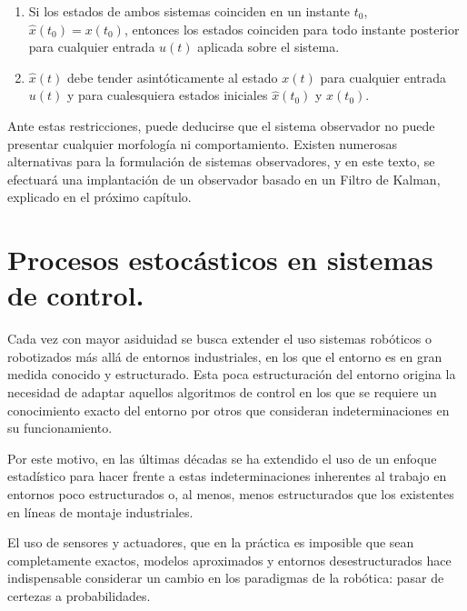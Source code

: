 \begin{enumerate}

\item Si los estados de ambos sistemas coinciden en un instante $t_0$, $\hat{x}(t_0) = x(t_0)$, entonces los estados coinciden para todo instante posterior para cualquier entrada $u(t)$ aplicada sobre el sistema. \par 

\item $\hat{x}(t)$ debe tender asintóticamente al estado $x(t)$ para cualquier entrada $u(t)$ y para cualesquiera estados iniciales $\hat{x}(t_0)$ y $x(t_0)$. \par 

\end{enumerate}

Ante estas restricciones, puede deducirse que el sistema observador no puede presentar cualquier morfología ni comportamiento. Existen numerosas alternativas para la formulación de sistemas observadores, y en este texto, se efectuará una implantación de un observador basado en un Filtro de Kalman, explicado en el próximo capítulo. \par 

\section{Procesos estocásticos en sistemas de control.}

Cada vez con mayor asiduidad se busca extender el uso sistemas robóticos o robotizados más allá de entornos industriales, en los que el entorno es en gran medida conocido y estructurado. Esta poca estructuración del entorno origina la necesidad de adaptar aquellos algoritmos de control en los que se requiere un conocimiento exacto del entorno por otros que consideran indeterminaciones en su funcionamiento. \par 

Por este motivo, en las últimas décadas se ha extendido el uso de un enfoque estadístico para hacer frente a estas indeterminaciones inherentes al trabajo en entornos poco estructurados o, al menos, menos estructurados que los existentes en líneas de montaje industriales. \par 

El uso de sensores y actuadores, que en la práctica es imposible que sean completamente exactos, modelos aproximados y entornos desestructurados hace indispensable considerar un cambio en los paradigmas de la robótica: pasar de certezas a probabilidades. \par 

